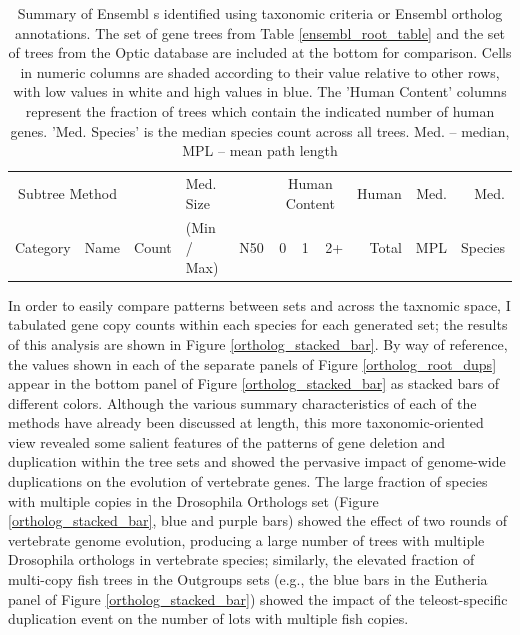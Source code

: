 \begin{landscape}
\begin{table}
\centering
\begin{tabular}{llrb{2.5cm}rrrrrrr}
\toprule
\multicolumn{2}{c}{Subtree Method} & &  Med. Size &  & \multicolumn{3}{c}{Human Content} & Human & Med. & Med. \\ \cmidrule(r){6-8} \cmidrule(r){1-2}
Category & Name & Count  & (Min / Max) & N50 & 0 & 1 & 2+ & Total & MPL & Species \\ 
  \midrule

\bottomrule
\end{tabular}
\caption{Summary of Ensembl \subtr{}s identified using taxonomic
  criteria or Ensembl ortholog annotations. The set of \cmp gene trees
  from Table \ref{ensembl_root_table} and the set of trees from the
  Optic database \citep{Heger2008} are included at the bottom for
  comparison. Cells in numeric columns are shaded according to their
  value relative to other rows, with low values in white and high
  values in blue. The 'Human Content' columns represent the fraction
  of trees which contain the indicated number of human
  genes. 'Med. Species' is the median species count across all
  trees. Med. -- median, MPL -- mean path length}
\label{ensembl_subtree_table}
\end{table}
\end{landscape}

In order to easily compare patterns between \subtr sets and across the
taxnomic space, I tabulated gene copy counts within each \ens species
for each generated \subtr set; the results of this analysis are shown
in Figure \ref{ortholog_stacked_bar}. By way of reference, the values
shown in each of the separate panels of Figure
\ref{ortholog_root_dups} appear in the bottom panel of Figure
\ref{ortholog_stacked_bar} as stacked bars of different
colors. Although the various summary characteristics of each of the
\subtr methods have already been discussed at length, this more
taxonomic-oriented view revealed some salient features of the patterns
of gene deletion and duplication within the tree sets and showed the
pervasive impact of genome-wide duplications on the evolution of
vertebrate genes. The large fraction of species with multiple copies
in the Drosophila Orthologs \subtr set (Figure
\ref{ortholog_stacked_bar}, blue and purple bars) showed the effect of
two rounds of vertebrate genome evolution, producing a large number of
trees with multiple Drosophila orthologs in vertebrate species;
similarly, the elevated fraction of multi-copy fish trees in the
Outgroups \subtr sets (e.g., the blue bars in the Eutheria panel of
Figure \ref{ortholog_stacked_bar}) showed the impact of the
teleost-specific duplication event on the number of \mammln{}
\acp{lot} with multiple fish copies.

